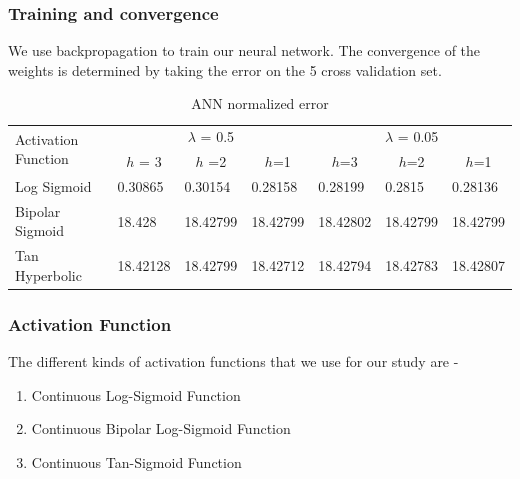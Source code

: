 \documentclass[review,twocolumn,5p]{elsarticle}
\begin{document}
\subsubsection{Training and convergence}
\label{subsec:training}

We use backpropagation to train our neural network. The convergence of the weights is determined by taking the error on the 5 cross validation set. 

\begin{table}[!t]
\centering
\caption{ANN normalized error}
\label{tab:error}

\vspace{15pt}
\begin{tabular}{|l|l|l|l|l|l|l|}
\hline
\multirow{2}{*}{Activation Function} & \multicolumn{3}{c|}{$\lambda$ = 0.5}                                                      & \multicolumn{3}{c|}{$\lambda$ = 0.05}                                                  \\ \cline{2-7} 
                  & \multicolumn{1}{c|}{$h$ = 3} & \multicolumn{1}{c|}{$h$ =2} & \multicolumn{1}{c|}{$h$=1} & \multicolumn{1}{c|}{$h$=3} & \multicolumn{1}{c|}{$h$=2} & \multicolumn{1}{c|}{$h$=1} \\ \hline
Log Sigmoid       & 0.30865                    & 0.30154                   & 0.28158                  & 0.28199                  & 0.2815                   & 0.28136                  \\ \hline
Bipolar Sigmoid   & 18.428                     & 18.42799                  & 18.42799                 & 18.42802                 & 18.42799                 & 18.42799                 \\ \hline
Tan Hyperbolic    & 18.42128                   & 18.42799                  & 18.42712                 & 18.42794                 & 18.42783                 & 18.42807                 \\ \hline
\end{tabular}
\end{table}


\subsubsection{Activation Function}
\label{subsec:activation}
The different kinds of activation functions that we use for our study are - 
\begin{enumerate}
\item Continuous Log-Sigmoid Function
\item Continuous Bipolar Log-Sigmoid Function
\item Continuous Tan-Sigmoid Function
\end{enumerate}
\end{document}
